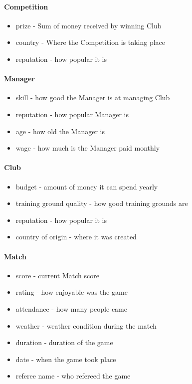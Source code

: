 \documentclass{report}
\begin{document}
\paragraph{Competition}
\begin{itemize}
    \item prize - Sum of money received by winning Club
    \item country - Where the Competition is taking place
    \item reputation - how popular it is
\end{itemize}


\paragraph{Manager}
\begin{itemize}
    \item skill - how good the Manager is at managing Club
    \item reputation - how popular Manager is
    \item age - how old the Manager is
    \item wage - how much is the Manager paid monthly
\end{itemize}


\paragraph{Club}
\begin{itemize}
    \item budget - amount of money it can spend yearly
    \item training ground quality - how good training grounds are
    \item reputation - how popular it is
    \item country of origin - where it was created
\end{itemize}


\paragraph{Match}
\begin{itemize}
    \item score - current Match score
    \item rating - how enjoyable was the game
    \item attendance - how many people came
    \item weather - weather condition during the match
    \item duration - duration of the game
    \item date - when the game took place
    \item referee name - who refereed the game
\end{itemize}
\end{document}
